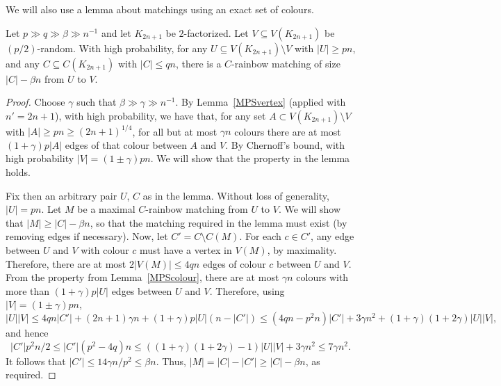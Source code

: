 We will also use a lemma about matchings using an exact set of colours.
\begin{lemma}\label{Lemma_matching_into_random_set_using_specified_colours}
Let $p\gg q\gg\beta \gg n^{-1}$ and let  $K_{2n+1}$ be $2$-factorized.
Let  $V\subseteq V(K_{2n+1})$  be $(p/2)$-random. With high probability, for any  $U\subseteq V(K_{2n+1})\setminus V$ with $|U|\geq pn$, and any $C\subseteq C(K_{2n+1})$ with $|C|\leq q n$, there is a $C$-rainbow matching of size $|C|-\beta n$ from $U$ to $V$.
\end{lemma}
\begin{proof}
Choose $\gamma$ such that $\beta\gg\gamma \gg n^{-1}$.
By Lemma~\ref{MPSvertex} (applied with $n'=2n+1$), with high probability, we have that, for any set $A\subset V(K_{2n+1})\setminus V$ with $|A|\geq pn\geq (2n+1)^{1/4}$, for all but at most $\gamma n$ colours there are at most $(1+\gamma)p|A|$ edges of that colour between $A$ and $V$. By Chernoff's bound, with high probability $|V|=(1\pm \gamma)pn$. We will show that the property in the lemma holds.

Fix then an arbitrary pair $U$, $C$ as in the lemma. Without loss of generality, $|U|=pn$. Let $M$ be a maximal $C$-rainbow matching from $U$ to $V$. We will show that $|M|\geq |C|-\beta n$, so that the matching required in the lemma must exist (by removing edges if necessary). Now, let $C'=C\setminus C(M)$. For each $c\in C'$, any edge between $U$ and $V$ with colour $c$ must have a vertex in $V(M)$, by maximality. Therefore, there are at most $2|V(M)|\leq 4qn$ edges of colour $c$ between $U$ and $V$. From the property from Lemma~\ref{MPScolour}, there  are at most $\gamma n$ colours with more than $(1+\gamma)p|U|$ edges between $U$ and $V$. Therefore, using $|V|=(1\pm \gamma)pn$, 
\[
|U||V|\leq 4qn|C'|+(2n+1)\gamma n+(1+\gamma)p|U|(n-|C'|)\leq (4qn-p^2n)|C'|+3\gamma n^2+ (1+\gamma)(1+2\gamma)|U||V|,
\]
and hence
\[
|C'|p^2n/2\leq |C'|(p^2-4q)n\leq ((1+\gamma)(1+2\gamma)-1)|U||V|+3\gamma n^2\leq 7\gamma n^2.
\]
It follows that $|C'|\leq 14\gamma n/p^2\leq \beta n$. Thus, $|M|= |C|-|C'|\geq |C|-\beta n$, as required.
\end{proof}

















